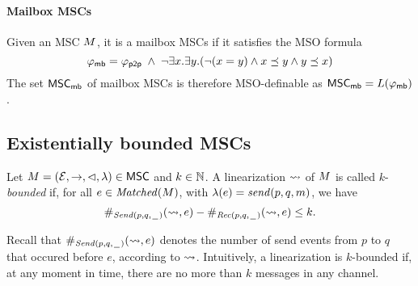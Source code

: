 \documentclass{article}
\begin{document}
\paragraph*{Mailbox MSCs}

Given an MSC $M$, it is a mailbox MSCs if it satisfies the MSO formula
\[
	\varphi_{\mathsf{mb}} = \varphi_{\mathsf{p2p}} \;\wedge\; \neg \exists x.\exists y.(\neg (x = y) \wedge x \preceq y \wedge y \preceq x)
\]
The set $\mathsf{MSC}_{\mathsf{mb}}$ of mailbox MSCs is therefore MSO-definable as $\mathsf{MSC}_{\mathsf{mb}}=L(\varphi_{\mathsf{mb}})$.

\subsection{Existentially bounded MSCs}

\begin{definition}\label{def:lin_k_bounded}
	Let $M = (\mathcal{E},\to,\lhd,\lambda) \in \mathsf{MSC}$ and $k \in \mathbb{N}$.
	A linearization $\rightsquigarrow$ of $M$ is called
	$k$-\emph{bounded} if, for all $e \in \mathit{Matched}(M)$, with $\lambda(e) = \mathit{send}(p, q, m)$, we have 
	\[
	\#_{{\mathit{Send}(p,q,\hspace{0.1em}\underline{\hspace{0.5em}}\hspace{0.1em})}}(\rightsquigarrow,e) - \#_{{\mathit{Rec}(p,q,\hspace{0.1em}\underline{\hspace{0.5em}}\hspace{0.1em})}}(\rightsquigarrow,e) \le k.
	\]
\end{definition}
\noindent Recall that $\#_{{\mathit{Send}(p,q,\hspace{0.1em}\underline{\hspace{0.5em}}\hspace{0.1em})}}(\rightsquigarrow,e)$ denotes the number of send events from $p$ to $q$ that occured before $e$, according to $\rightsquigarrow$. Intuitively, a linearization is $k$-bounded if, at any moment in time, there are no more than $k$ messages in any channel.
\end{document}
